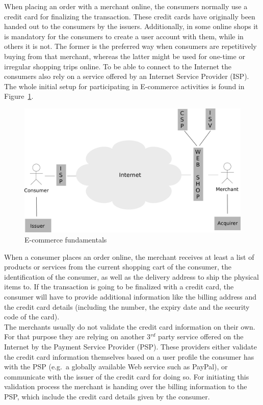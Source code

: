 When placing an order with a merchant online, the consumers normally use a credit card for finalizing the transaction. These credit cards have originally been handed out to the consumers by the issuers. Additionally, in some online shops it is mandatory for the consumers to create a user account with them, while in others it is not. The former is the preferred way when consumers are repetitively buying from that merchant, whereas the latter might be used for one-time or irregular shopping trips online. To be able to connect to the Internet the consumers also rely on a service offered by an Internet Service Provider (\gls{ISP}). The whole initial setup for participating in \gls{E-commerce} activities is found in Figure~\ref{fig:images_ecommerce_scenario}.\@

\begin{figure}[H]
	\centering
		\includegraphics[width=0.9\columnwidth]{images/e-commerce-scenario.pdf}
	\caption{\Gls{E-commerce} fundamentals}
\label{fig:images_ecommerce_scenario}
\end{figure}

When a consumer places an order online, the merchant receives at least a list of products or services from the current shopping cart of the consumer, the identification of the consumer, as well as the delivery address to ship the physical items to. If the transaction is going to be finalized with a credit card, the consumer will have to provide additional information like the billing address and the credit card details (including the number, the expiry date and the security code of the card). \\

The merchants usually do not validate the credit card information on their own. For that purpose they are relying on another 3$^{rd}$ party service offered on the Internet by the Payment Service Provider (\gls{PSP}). These providers either validate the credit card information themselves based on a user profile the consumer has with the \gls{PSP} (e.g.\ a globally available Web service such as PayPal), or communicate with the issuer of the credit card for doing so. For initiating this validation process the merchant is handing over the billing information to the \gls{PSP}, which include the credit card details given by the consumer. \\


